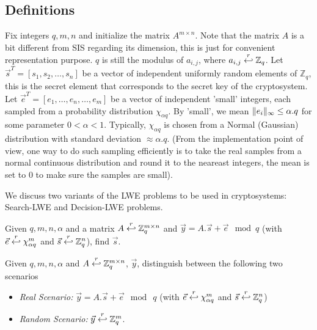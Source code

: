 \subsection{Definitions}
\label{sec:LWEDefs}
Fix integers $q, m, n$ and initialize the matrix $A^{m \times n}$. Note that the
matrix $A$ is a bit different from SIS regarding its dimension, this is just for
convenient representation purpose.  $q$ is still the modulus of $a_{i,j}$, where
$a_{i,j} \stackrel{r}{\hookleftarrow} \mathbb{Z}_q$. Let
$\vec{s}^T = \left[ s_1,s_2,\dots,s_n \right]$ be a vector of independent
uniformly random elements of $\mathbb{Z}_q$, this is the secret element that
corresponds to the secret key of the cryptosystem. Let
$\vec{e}^T = [e_1,\dots,e_n,\dots,e_m]$ be a vector of independent 'small'
integers, each sampled from a probability distribution $\chi_{\alpha q}$. By
'small', we mean $\Vert e_i \Vert_{\infty} \leq \alpha . q$ for some parameter
$0 < \alpha < 1$. Typically, $\chi_{\alpha q}$ is chosen from a Normal
(Gaussian) distribution with standard deviation $\approx \alpha . q$. (From the
implementation point of view, one way to do such sampling efficiently is to take
the real samples from a normal continuous distribution and round it to the
neareast integers, the mean is set to 0 to make sure the samples are small).


We discuss two variants of the LWE problems to be used in cryptosystems:
Search-LWE and Decision-LWE problems.

\begin{definition}
   Given $q,m,n,\alpha$ and a matrix
  $A \stackrel{r}{\hookleftarrow} \mathbb{Z}_q^{m \times n}$ and
  $\vec{y} = A.\vec{s} + \vec{e} \mod q$ (with
  $\vec{e} \stackrel{r}{\hookleftarrow} \chi_{\alpha q}^m$ and
  $\vec{s} \stackrel{r}{\hookleftarrow} \mathbb{Z}_q^n$), find $\vec{s}$.
  \label{def:Search-LWEProb}
\end{definition}

\begin{definition}
   Given $q, m, n, \alpha$ and
  $A \stackrel{r}{\hookleftarrow} \mathbb{Z}_q^{m \times n}$, $\vec{y}$, distinguish between
  the following two scenarios
  \begin{itemize}
  \item \emph{Real Scenario:} $\vec{y} = A.\vec{s} + \vec{e} \mod \ q$ (with
    $\vec{e} \stackrel{r}{\hookleftarrow} \chi_{\alpha q}^m$ and
    $\vec{s} \stackrel{r}{\hookleftarrow} \mathbb{Z}_q^n$)
  \item \emph{Random Scenario:} $\vec{y} \stackrel{r}{\hookleftarrow} \mathbb{Z}_q^m$.
  \end{itemize}
  \label{def:Decision-LWEProb}
\end{definition}

